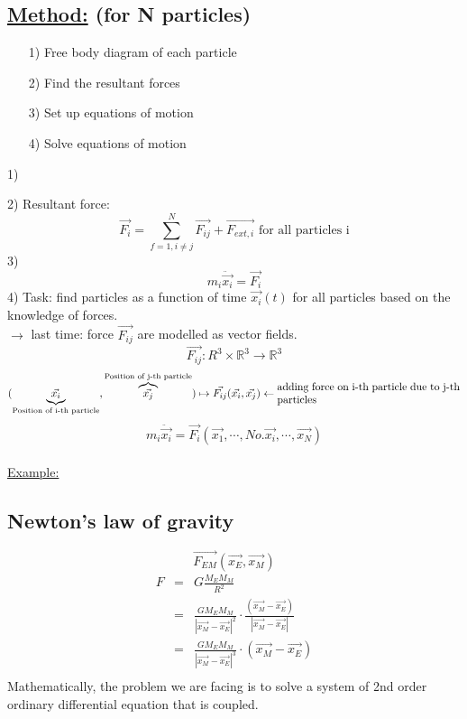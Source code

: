 \documentclass[a4paper, 12pt]{article}
\begin{document}
\subsection{\underline{Method:} (for N particles)}
\begin{enumerate}
\item[1)] Free body diagram of each particle
\item[2)] Find the resultant forces
\item[3)] Set up equations of motion
\item[4)] Solve equations of motion
\end{enumerate}
1)\\ 
\begin{center}
\end{center}
2) Resultant force: $$\vec{F_i} = \sum_{f=1, i\neq j}^{N} \vec{F_{ij}} + \vec{F_{ext,i}} \text{ for all particles i}$$
3) $$m_i\ddot{\vec{x_i}} = \vec{F_i}$$
4) Task: find particles as a function of time $\vec{x_i}(t)$ for all particles based on the knowledge of forces.\\
$\rightarrow$ last time: force $\vec{F_{ij}}$ are modelled as vector fields. $$\vec{F_{ij}} : R^3 \times \mathbb{R}^3 \rightarrow \mathbb{R}^3$$
$$(\underbrace{\vec{x_i}}_{\text{Position of i-th particle}},\overbrace{\vec{x_j}}^{\text{Position of j-th particle}}) \mapsto \vec{F_{ij}}(\vec{x_i},\vec{x_j})\leftarrow \text{\parbox{6cm}{adding force on i-th particle due to j-th particles}}$$
$$m_i\ddot{\vec{x_i}} = \vec{F_i}(\vec{x_1},\cdots,No. \vec{x_i},\cdots,\vec{x_N})$$\\
\underline{Example:}
\subsection{Newton's law of gravity}
$$\vec{F_{EM}}(\vec{x_E},\vec{x_M})$$
\begin{eqnarray*}
F & = & G\frac{M_E M_M}{R^2}\\
& = &  \frac{GM_E M_M}{|\vec{x_M}-\vec{x_E}|^2} \cdot \frac{(\vec{x_M}-\vec{x_E})}{|\vec{x_M}-\vec{x_E}|}\\
& = & \frac{GM_E M_M}{|\vec{x_M}-\vec{x_E}|^3} \cdot (\vec{x_M}-\vec{x_E})\\
\end{eqnarray*}
Mathematically, the problem we are facing is to solve a system of 2nd order ordinary differential equation that is coupled.
\end{document}
